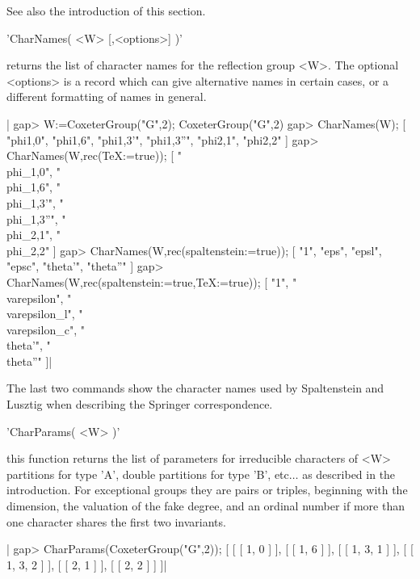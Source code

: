 See also the introduction of this section.


'CharNames( <W> [,<options>] )'

returns  the  list  of  character  names  for the reflection group <W>. The
optional  <options> is a record which can give alternative names in certain
cases, or a different formatting of names in general.

|    gap> W:=CoxeterGroup("G",2);
    CoxeterGroup("G",2)
    gap> CharNames(W);
    [ "phi{1,0}", "phi{1,6}", "phi{1,3}'", "phi{1,3}''", "phi{2,1}",
      "phi{2,2}" ]
    gap> CharNames(W,rec(TeX:=true));
    [ "\\phi_{1,0}", "\\phi_{1,6}", "\\phi_{1,3}'", "\\phi_{1,3}''",
      "\\phi_{2,1}", "\\phi_{2,2}" ]
    gap> CharNames(W,rec(spaltenstein:=true));
    [ "1", "eps", "epsl", "epsc", "theta'", "theta''" ]
    gap> CharNames(W,rec(spaltenstein:=true,TeX:=true));
    [ "1", "\\varepsilon", "\\varepsilon_l", "\\varepsilon_c",
      "\\theta'", "\\theta''" ]|

The  last two  commands show  the character  names used by Spaltenstein and
Lusztig when describing the Springer correspondence.


'CharParams( <W> )'

this  function returns the list of parameters for irreducible characters of
<W>\:  partitions for type 'A', double partitions for type 'B', etc$\ldots$
as  described in the introduction. For exceptional groups they are pairs or
triples,  beginning with the  dimension, the valuation  of the fake degree,
and  an ordinal  number if  more than  one character  shares the  first two
invariants.

|    gap> CharParams(CoxeterGroup("G",2));
    [ [ [ 1, 0 ] ], [ [ 1, 6 ] ], [ [ 1, 3, 1 ] ], [ [ 1, 3, 2 ] ],
      [ [ 2, 1 ] ], [ [ 2, 2 ] ] ]|

